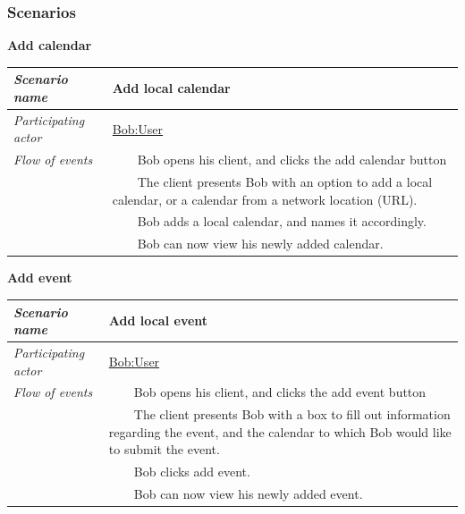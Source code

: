 \documentclass[10pt]{report}
\newcommand{\tabitem}{~~\llap{\textbullet}~~}
\numberwithin{equation}{section} %
\numberwithin{figure}{section} %
\numberwithin{table}{section} %
\begin{document}
\subsubsection{Scenarios}
\begin{table}[H]
\noindent \textbf{Add calendar}\\
\begin{tabularx}{\textwidth}{l X}
\midrule
\textit{Scenario name} & Add local calendar \\ \midrule
\textit{Participating actor} & \underline{Bob:User} \\ \midrule
\textit{Flow of events} & \tabitem Bob opens his client, and clicks the add
                                       calendar button \\
                                       & \tabitem The client presents Bob with
                                       an option to add a local calendar, or a
                                       calendar from a network location (URL). \\
                                       & \tabitem Bob adds a local calendar, and
                                       names it accordingly. \\
                                       & \tabitem Bob can now view his newly
                                       added calendar. \\
                                       \midrule
\end{tabularx}
\end{table}

\begin{table}[H]
\noindent \textbf{Add event}\\
\begin{tabularx}{\textwidth}{l X}
\midrule
\textit{Scenario name} & Add local event \\ \midrule
\textit{Participating actor} & \underline{Bob:User} \\ \midrule
\textit{Flow of events} & \tabitem Bob opens his client, and clicks the add
                                       event button \\
                                       & \tabitem The client presents Bob with
                                       a box to fill out information regarding
                                       the event, and the calendar to which Bob
                                       would like to submit the event.  \\
                                       & \tabitem Bob clicks add event.  \\
                                       & \tabitem Bob can now view his newly
                                       added event. \\
                                       \midrule
\end{tabularx}
\end{table}
\end{document}

